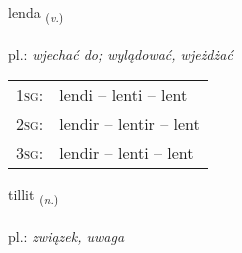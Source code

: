 \documentclass[frontgrid, backgrid]{flacards}\usepackage[]{graphicx}\usepackage[]{xcolor}
\begin{document}
\renewcommand{\flhead}{\vskip5pt \fboxsep=0pt {\small\bfseries\footnotesize Sagnorð | czasownik}}
\renewcommand{\fcfoot}{\vskip5pt \fboxsep=0pt \hspace{2pt}{\small\bfseries\footnotesize 1K}}

\renewcommand{\blhead}{\vskip5pt {\small\bfseries\footnotesize Sagnorð | czasownik }}
\renewcommand{\bcfoot}{\vskip5pt \hspace{2pt}{\small\bfseries\footnotesize 1K}}


{lenda \small{\textsubscript{(\textit{v.})}} \\[1ex] %
\textphonetic{[lɛnta]} \\
pl.: \emph{wjechać do; wylądować, wjeżdżać} \\  [2ex]
\renewcommand*{\arraystretch}{0.8}
\begin{tabular}{p{1cm}l}
\textsc{1sg}: & lendi -- lenti -- lent \\ 
\textsc{2sg}: & lendir -- lentir -- lent \\ 
\textsc{3sg}: & lendir -- lenti -- lent \\ 
\end{tabular}
}

\renewcommand{\flhead}{\vskip5pt \fboxsep=0pt {\small\bfseries\footnotesize Nafnorð | rzeczownik}}
\renewcommand{\fcfoot}{\vskip5pt \fboxsep=0pt \hspace{2pt}{\small\bfseries\footnotesize 1K}}

\renewcommand{\blhead}{\vskip5pt {\small\bfseries\footnotesize Nafnorð | rzeczownik }}
\renewcommand{\bcfoot}{\vskip5pt \hspace{2pt}{\small\bfseries\footnotesize 1K}}


{tillit \small{\textsubscript{(\textit{n.})}} \\[1ex] %
\textphonetic{[tʰɪlɪt]} \\
pl.: \emph{związek, uwaga} \\  [2ex]
\renewcommand*{\arraystretch}{0.8}
}
\end{document}
